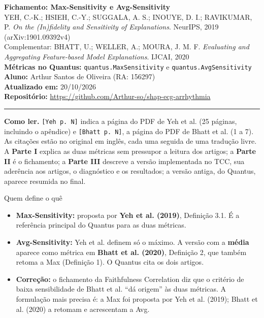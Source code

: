 \documentclass[11pt,a4paper]{article}
\begin{document}
\begin{center}
    {\LARGE \textbf{Fichamento: Max-Sensitivity e Avg-Sensitivity}} \\[0.35em]
    {\large YEH, C.-K.; HSIEH, C.-Y.; SUGGALA, A. S.; INOUYE, D. I.; RAVIKUMAR, P. \textit{On the (In)fidelity and Sensitivity of Explanations}. NeurIPS, 2019 (arXiv:1901.09392v4)} \\[0.3em]
    {\normalsize Complementar: BHATT, U.; WELLER, A.; MOURA, J. M. F. \textit{Evaluating and Aggregating Feature-based Model Explanations}. IJCAI, 2020} \\[0.3em]
    \textbf{Métricas no Quantus:} \texttt{quantus.MaxSensitivity} e \texttt{quantus.AvgSensitivity} \\[0.2em]
    \textbf{Aluno:} Arthur Santos de Oliveira (RA: 156297) \\[0.2em]
    \textbf{Atualizado em:} 20/10/2026 \\[0.2em]
    \textbf{Repositório:} \url{https://github.com/Arthur-so/shap-ecg-arrhythmia}
\end{center}
\vspace{-0.5em}
\hrule
\vspace{0.8em}

\textbf{Como ler.} \texttt{[Yeh p. N]} indica a página do PDF de Yeh et al. (25 páginas, incluindo o apêndice) e \texttt{[Bhatt p. N]}, a página do PDF de Bhatt et al. (1 a 7). As citações estão no original em inglês, cada uma seguida de uma tradução livre. A \textbf{Parte I} explica as duas métricas sem pressupor a leitura dos artigos; a \textbf{Parte II} é o fichamento; a \textbf{Parte III} descreve a versão implementada no TCC, sua aderência aos artigos, o diagnóstico e os resultados; a versão antiga, do Quantus, aparece resumida no final.

\begin{infobox}[note]{Quem define o quê}
\begin{itemize}
\item \textbf{Max-Sensitivity:} proposta por \textbf{Yeh et al. (2019)}, Definição 3.1. É a referência principal do Quantus para as duas métricas.
\item \textbf{Avg-Sensitivity:} Yeh et al. definem só o máximo. A versão com a \textbf{média} aparece como métrica em \textbf{Bhatt et al. (2020)}, Definição 2, que também retoma a Max (Definição 1). O Quantus cita os dois artigos.
\item \textbf{Correção:} o fichamento da Faithfulness Correlation diz que o critério de baixa sensibilidade de Bhatt et al. “dá origem” às duas métricas. A formulação mais precisa é: a Max foi proposta por Yeh et al. (2019); Bhatt et al. (2020) a retomam e acrescentam a Avg.
\end{itemize}
\end{infobox}
\end{document}
